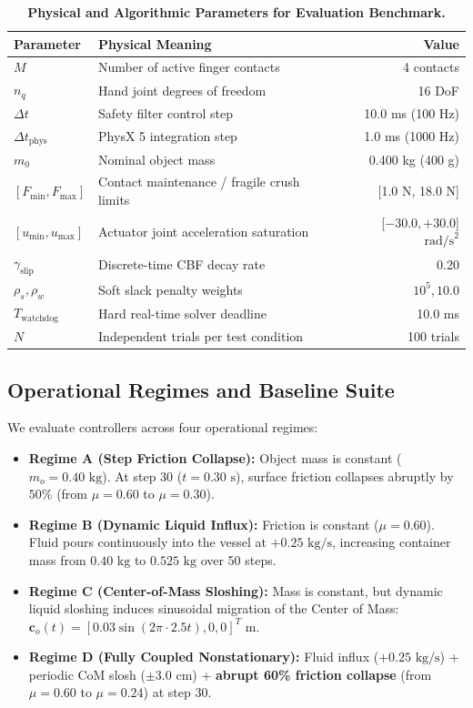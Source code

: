 \begin{table}[t]
\centering
\caption{\textbf{Physical and Algorithmic Parameters for Evaluation Benchmark.}}
\label{tab:parameters}
\small
\begin{tabular}{llr}
\toprule
\textbf{Parameter} & \textbf{Physical Meaning} & \textbf{Value} \\
\midrule
$M$ & Number of active finger contacts & 4 contacts \\
$n_q$ & Hand joint degrees of freedom & 16 DoF \\
$\Delta t$ & Safety filter control step & 10.0 ms (100 Hz) \\
$\Delta t_{\text{phys}}$ & PhysX 5 integration step & 1.0 ms (1000 Hz) \\
$m_0$ & Nominal object mass & 0.400 kg (400 g) \\
$[F_{\min}, F_{\max}]$ & Contact maintenance / fragile crush limits & [1.0 N, 18.0 N] \\
$[u_{\min}, u_{\max}]$ & Actuator joint acceleration saturation & [$-30.0, +30.0$] $\text{rad/s}^2$ \\
$\gamma_{\text{slip}}$ & Discrete-time CBF decay rate & 0.20 \\
$\rho_s, \rho_w$ & Soft slack penalty weights & $10^5, 10.0$ \\
$T_{\text{watchdog}}$ & Hard real-time solver deadline & 10.0 ms \\
$N$ & Independent trials per test condition & 100 trials \\
\bottomrule
\end{tabular}
\end{table}

\subsection{Operational Regimes and Baseline Suite}
We evaluate controllers across four operational regimes:
\begin{itemize}
    \item \textbf{Regime A (Step Friction Collapse):} Object mass is constant ($m_o = 0.40\text{ kg}$). At step $30$ ($t = 0.30\text{ s}$), surface friction collapses abruptly by $50\%$ (from $\mu = 0.60$ to $\mu = 0.30$).
    \item \textbf{Regime B (Dynamic Liquid Influx):} Friction is constant ($\mu = 0.60$). Fluid pours continuously into the vessel at $+0.25\text{ kg/s}$, increasing container mass from $0.40\text{ kg}$ to $0.525\text{ kg}$ over 50 steps.
    \item \textbf{Regime C (Center-of-Mass Sloshing):} Mass is constant, but dynamic liquid sloshing induces sinusoidal migration of the Center of Mass: $\mathbf{c}_o(t) = [0.03 \sin(2\pi \cdot 2.5 t), 0, 0]^T\text{ m}$.
    \item \textbf{Regime D (Fully Coupled Nonstationary):} Fluid influx ($+0.25\text{ kg/s}$) + periodic CoM slosh ($\pm 3.0\text{ cm}$) + \textbf{abrupt 60\% friction collapse} (from $\mu = 0.60$ to $\mu = 0.24$) at step $30$.
\end{itemize}


